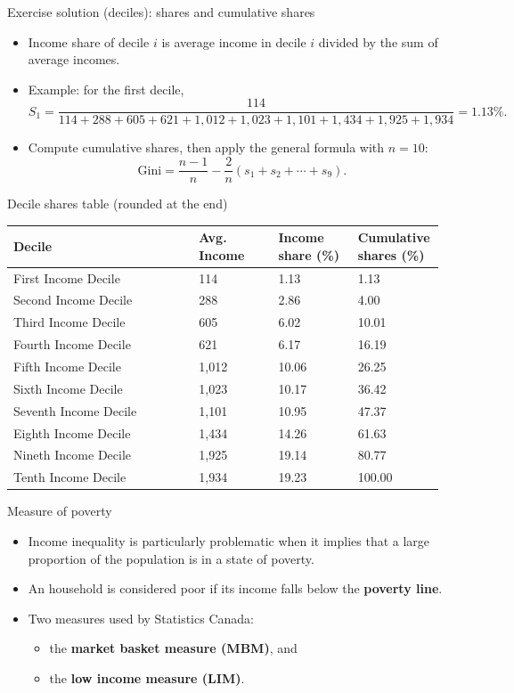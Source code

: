 \documentclass[aspectratio=169]{beamer}
\begin{document}
\begin{frame}{Exercise solution (deciles): shares and cumulative shares}
\transfade
\begin{itemize}
\item Income share of decile $i$ is average income in decile $i$ divided by the sum of average incomes.
\item Example: for the first decile,
\[
S_1=\frac{114}{114+288+605+621+1{,}012+1{,}023+1{,}101+1{,}434+1{,}925+1{,}934}=1.13\%.
\]
\item Compute cumulative shares, then apply the general formula with $n=10$:
\[
\text{Gini}=\frac{n-1}{n}-\frac{2}{n}(s_1+s_2+\cdots+s_9).
\]
\end{itemize}
\end{frame}

\begin{frame}{Decile shares table (rounded at the end)}
\transfade
\begin{center}
\small
\begin{tabular}{p{0.42\linewidth} p{0.18\linewidth} p{0.18\linewidth} p{0.18\linewidth}}
\toprule
\textbf{Decile} & \textbf{Avg. Income} & \textbf{Income share (\%)} & \textbf{Cumulative shares (\%)} \\
\midrule
First Income Decile & 114 & 1.13 & 1.13 \\
Second Income Decile & 288 & 2.86 & 4.00 \\
Third Income Decile & 605 & 6.02 & 10.01 \\
Fourth Income Decile & 621 & 6.17 & 16.19 \\
Fifth Income Decile & 1{,}012 & 10.06 & 26.25 \\
Sixth Income Decile & 1{,}023 & 10.17 & 36.42 \\
Seventh Income Decile & 1{,}101 & 10.95 & 47.37 \\
Eighth Income Decile & 1{,}434 & 14.26 & 61.63 \\
Nineth Income Decile & 1{,}925 & 19.14 & 80.77 \\
Tenth Income Decile & 1{,}934 & 19.23 & 100.00 \\
\bottomrule
\end{tabular}
\end{center}
\end{frame}

\begin{frame}{Measure of poverty}
\transfade
\begin{itemize}
\item Income inequality is particularly problematic when it implies that a large proportion of the population is in a state of poverty.
\item An household is considered poor if its income falls below the \textbf{poverty line}.
\item Two measures used by Statistics Canada:
\begin{itemize}
\item the \textbf{market basket measure (MBM)}, and
\item the \textbf{low income measure (LIM)}.
\end{itemize}
\end{itemize}
\end{frame}
\end{document}
